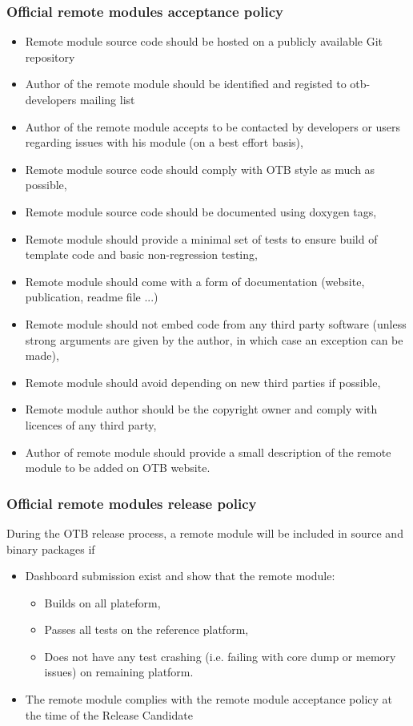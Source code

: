 \documentclass[8pt]{beamer}
\begin{document}
\begin{frame}
\frametitle{Official remote modules acceptance policy}
\begin{itemize}
\item Remote module source code should be hosted on a publicly available Git repository
\item Author of the remote module should be identified and registed to otb-developers mailing list
\item Author of the remote module accepts to be contacted by developers or users regarding issues with his module (on a best effort basis),
\item Remote module source code should comply with OTB style as much as possible,
\item Remote module source code should be documented using doxygen tags,
\item Remote module should provide a minimal set of tests to ensure build of template code and basic non-regression testing,
\item Remote module should come with a form of documentation (website, publication, readme file ...)
\item Remote module should not embed code from any third party software (unless strong arguments are given by the author, in which case an exception can be made),
\item Remote module should avoid depending on new third parties if possible,
\item Remote module author should be the copyright owner and comply with licences of any third party,
\item Author of remote module should provide a small description of the remote module to be added on OTB website.
\end{itemize}
\end{frame}

\begin{frame}
\frametitle{Official remote modules release policy}

During the OTB release process, a remote module will be included in source and binary packages if
\begin{itemize}
\item Dashboard submission exist and show that the remote module:
     \begin{itemize}
       \item Builds on all plateform,
       \item Passes all tests on the reference platform,
       \item Does not have any test crashing (i.e. failing with core dump or memory issues) on remaining platform.
     \end{itemize}
\item The remote module complies with the remote module acceptance policy at the time of the Release Candidate 
\end{itemize}

\end{frame}
\end{document}
